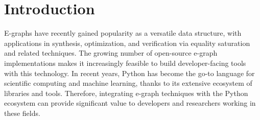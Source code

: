 \documentclass[sigplan,screen,review]{acmart}
\begin{document}




\maketitle

\section{Introduction}
E-graphs have recently gained popularity as a versatile data structure, with applications in synthesis, optimization, and verification via equality saturation and related techniques. The growing number of open-source e-graph implementations makes it increasingly feasible to build developer-facing tools with this technology. In recent years, Python has become the go-to language for scientific computing and machine learning, thanks to its extensive ecosystem of libraries and tools. Therefore, integrating e-graph techniques with the Python ecosystem can provide significant value to developers and researchers working in these fields.
\end{document}
